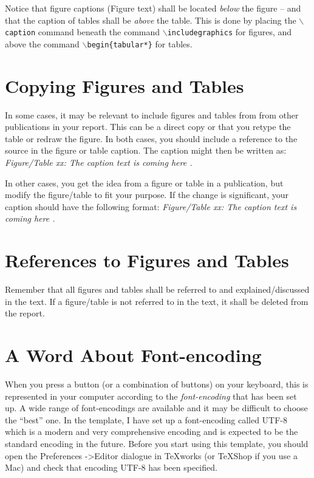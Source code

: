 \begin{remark}
Notice that figure captions (Figure text) shall be located \emph{below} the figure -- and that the caption of tables shall be \emph{above} the table. This is done by placing the $\backslash$\texttt{caption} command beneath the command $\backslash$\texttt{includegraphics} for figures, and above the command $\backslash$\texttt{begin\{tabular*\}} for tables.
\end{remark}
\section{Copying Figures and Tables}
In some cases, it may be relevant to include figures and tables from from other publications in your report. This can be a direct copy or that you retype the table or redraw the figure. In both cases, you should include a reference to the source in the figure or table caption. The caption might then be written as: \textsl{Figure/Table xx: The caption text is coming here \citep{rausand04}.}

In other cases, you get the idea from a figure or table in a publication, but modify the figure/table to fit your purpose. If the change is significant, your caption should have the following format: \textsl{Figure/Table xx: The caption text is coming here \citep[adapted from][]{rausand04}.}

\section{References to Figures and Tables}
Remember that all figures and tables shall be referred to and explained/discussed in the text. If a figure/table is not referred to in the text, it shall be deleted from the report.
\section{A Word About Font-encoding}
When you press a button (or a combination of buttons) on your keyboard, this is represented in your computer according to the \emph{font-encoding} that has been set up. A wide range of font-encodings are available and it may be difficult to choose the ``best'' one. In the template, I have set up a font-encoding called UTF-8 which is a modern and very comprehensive encoding and is expected to be the standard encoding in the future. Before you start using this template, you should open the Preferences ->Editor dialogue in TeXworks (or TeXShop if you use a Mac) and check that encoding UTF-8 has been specified. 

